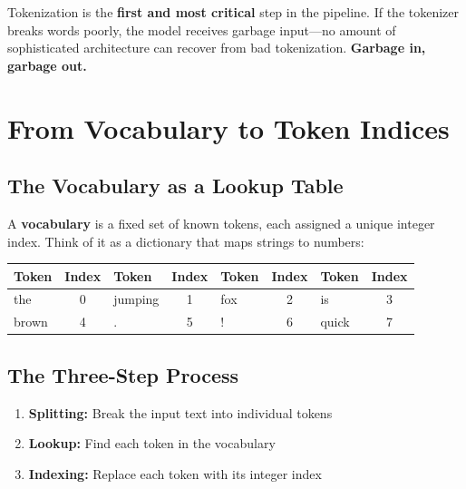 \documentclass[11pt,a4paper]{article}
\begin{document}
\begin{tcolorbox}[intuitionbox={Key Insight}]
Tokenization is the \textbf{first and most critical} step in the pipeline. If the tokenizer breaks words poorly, the model receives garbage input---no amount of sophisticated architecture can recover from bad tokenization. \textbf{Garbage in, garbage out.}
\end{tcolorbox}

\section{From Vocabulary to Token Indices}

\subsection{The Vocabulary as a Lookup Table}

A \textbf{vocabulary} is a fixed set of known tokens, each assigned a unique integer index. Think of it as a dictionary that maps strings to numbers:

\begin{center}
\begin{tabular}{@{}lclclclc@{}}
\toprule
\textbf{Token} & \textbf{Index} & \textbf{Token} & \textbf{Index} & \textbf{Token} & \textbf{Index} & \textbf{Token} & \textbf{Index} \\
\midrule
the & 0 & jumping & 1 & fox & 2 & is & 3 \\
brown & 4 & . & 5 & ! & 6 & quick & 7 \\
\bottomrule
\end{tabular}
\end{center}

\subsection{The Three-Step Process}

\begin{enumerate}[leftmargin=1.5em]
    \item \textbf{Splitting:} Break the input text into individual tokens
    \item \textbf{Lookup:} Find each token in the vocabulary
    \item \textbf{Indexing:} Replace each token with its integer index
\end{enumerate}
\end{document}
